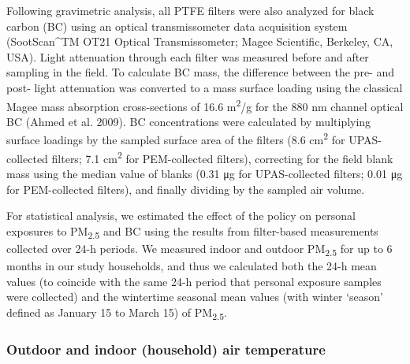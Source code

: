\documentclass[
  letterpaper,
  DIV=11,
  numbers=noendperiod]{scrartcl}
\begin{document}
Following gravimetric analysis, all PTFE filters were also analyzed for
black carbon (BC) using an optical transmissometer data acquisition
system (SootScan\^{}TM OT21 Optical Transmissometer; Magee Scientific,
Berkeley, CA, USA). Light attenuation through each filter was measured
before and after sampling in the field. To calculate BC mass, the
difference between the pre- and post- light attenuation was converted to
a mass surface loading using the classical Magee mass absorption
cross-sections of 16.6 m\textsuperscript{2}/g for the 880 nm channel
optical BC (Ahmed et al. 2009). BC concentrations were calculated by
multiplying surface loadings by the sampled surface area of the filters
(8.6 cm\textsuperscript{2} for UPAS-collected filters; 7.1
cm\textsuperscript{2} for PEM-collected filters), correcting for the
field blank mass using the median value of blanks (0.31 μg for
UPAS-collected filters; 0.01 μg for PEM-collected filters), and finally
dividing by the sampled air volume.

For statistical analysis, we estimated the effect of the policy on
personal exposures to PM\textsubscript{2.5} and BC using the results
from filter-based measurements collected over 24-h periods. We measured
indoor and outdoor PM\textsubscript{2.5} for up to 6 months in our study
households, and thus we calculated both the 24-h mean values (to
coincide with the same 24-h period that personal exposure samples were
collected) and the wintertime seasonal mean values (with winter `season'
defined as January 15 to March 15) of PM\textsubscript{2.5}.

\hypertarget{outdoor-and-indoor-household-air-temperature}{%
\subsubsection{Outdoor and indoor (household) air
temperature}\label{outdoor-and-indoor-household-air-temperature}}
\end{document}
